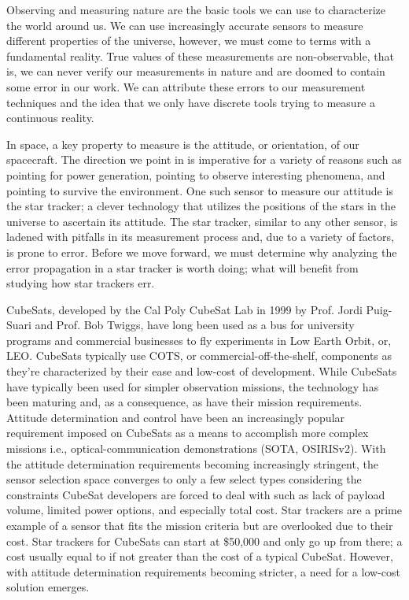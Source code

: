 \par \qquad Observing and measuring nature are the basic tools we can use to characterize the world around us.
We can use increasingly accurate sensors to measure different properties of the universe, however, we must come to terms with a fundamental reality.
True values of these measurements are non-observable, that is, we can never verify our measurements in nature and are doomed to contain some error in our work.
We can attribute these errors to our measurement techniques and the idea that we only have discrete tools trying to measure a continuous reality.

\par \qquad In space, a key property to measure is the attitude, or orientation, of our spacecraft.
The direction we point in is imperative for a variety of reasons such as pointing for power generation, pointing to observe interesting phenomena, and pointing to survive the environment.
One such sensor to measure our attitude is the star tracker; a clever technology that utilizes the positions of the stars in the universe to ascertain its attitude.
The star tracker, similar to any other sensor, is ladened with pitfalls in its measurement process and, due to a variety of factors, is prone to error.
Before we move forward, we must determine why analyzing the error propagation in a star tracker is worth doing; what will benefit from studying how star trackers err.

\par \qquad CubeSats, developed by the Cal Poly CubeSat Lab in 1999 by Prof. Jordi Puig-Suari and Prof. Bob Twiggs, have long been used as a bus for university programs and commercial businesses to fly experiments in Low Earth Orbit, or, LEO.
CubeSats typically use COTS, or commercial-off-the-shelf, components as they're characterized by their ease and low-cost of development.
While CubeSats have typically been used for simpler observation missions, the technology has been maturing and, as a consequence, as have their mission requirements.
Attitude determination and control have been an increasingly popular requirement imposed on CubeSats as a means to accomplish more complex missions i.e., optical-communication demonstrations (SOTA, OSIRISv2)\cite{OpticalCommsInSpace}.
With the attitude determination requirements becoming increasingly stringent, the sensor selection space converges to only a few select types considering the constraints CubeSat developers are forced to deal with such as lack of payload volume, limited power options, and especially total cost.
Star trackers are a prime example of a sensor that fits the mission criteria but are overlooked due to their cost.
Star trackers for CubeSats can start at \$50,000 and only go up from there; a cost usually equal to if not greater than the cost of a typical CubeSat.
However, with attitude determination requirements becoming stricter, a need for a low-cost solution emerges.

